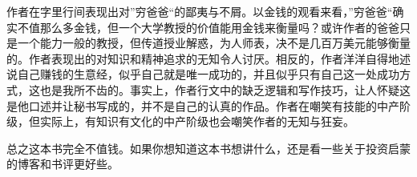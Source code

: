 作者在字里行间表现出对”穷爸爸“的鄙夷与不屑。以金钱的观看来看，”穷爸爸“确实不值那么多金钱，但一个大学教授的价值能用金钱来衡量吗？或许作者的爸爸只是一个能力一般的教授，但传道授业解惑，为人师表，决不是几百万美元能够衡量的。作者表现出的对知识和精神追求的无知令人讨厌。相反的，作者洋洋自得地述说自己赚钱的生意经，似乎自己就是唯一成功的，并且似乎只有自己这一处成功方式，这也是我所不齿的。事实上，作者行文中的缺乏逻辑和写作技巧，让人怀疑这是他口述并让秘书写成的，并不是自己的认真的作品。作者在嘲笑有技能的中产阶级，但实际上，有知识有文化的中产阶级也会嘲笑作者的无知与狂妄。

总之这本书完全不值钱。如果你想知道这本书想讲什么，还是看一些关于投资启蒙的博客和书评更好些。